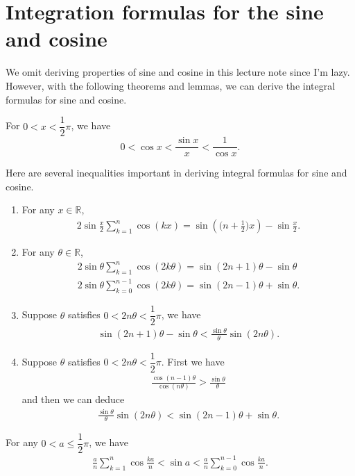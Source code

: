 	\section{Integration formulas for the sine and cosine}
	We omit deriving properties of sine and cosine in this lecture note since I'm lazy. However, with the following theorems and lemmas, we can derive the integral formulas for sine and cosine.
	\begin{theoremenv}
		For $0<x<\dfrac{1}{2}\pi$, we have
		\[
		0<\cos x< \frac{\sin x}{x} < \frac{1}{\cos x}.
		\]
	\end{theoremenv}
	\begin{lemmaenv}
		Here are several inequalities important in deriving integral formulas
		for sine and cosine.
		\begin{enumerate}
			\item For any $x\in\mathbb R$,
			\begin{align*}
				2\sin\frac{x}{2}\sum_{k=1}^{n}\cos(kx)=\sin\!\left(\Big(n+\frac12\Big)x\right)-\sin\frac{x}{2}.
			\end{align*}
			
			\item For any $\theta\in\mathbb R$,
			\begin{align*}
				2\sin\theta\sum_{k=1}^{n}\cos(2k\theta)=\sin(2n+1)\theta-\sin\theta
				\\
				2\sin\theta\sum_{k=0}^{n-1}\cos(2k\theta)=\sin(2n-1)\theta+\sin\theta.
			\end{align*}
			
			\item Suppose $\theta$ satisfies $0<2n\theta<\dfrac12\pi$, we have
			\begin{align*}
				\sin(2n+1)\theta-\sin\theta<\frac{\sin\theta}{\theta}\sin(2n\theta).
			\end{align*}
			
			\item Suppose $\theta$ satisfies $0<2n\theta<\dfrac12\pi$. First we have
			\begin{align*}
				\frac{\cos(n-1)\theta}{\cos(n\theta)}>\frac{\sin\theta}{\theta}
			\end{align*}
			and then we can deduce
			\begin{align*}
				\frac{\sin\theta}{\theta}\sin(2n\theta)<\sin(2n-1)\theta+\sin\theta.
			\end{align*}
		\end{enumerate}
	\end{lemmaenv}
	\begin{theoremenv}
		For any $0<a\le \dfrac12\pi$, we have
		\begin{align*}
			\frac{a}{n}\sum_{k=1}^{n}\cos\frac{ka}{n}<\sin a
			<
			\frac{a}{n}\sum_{k=0}^{n-1}\cos\frac{ka}{n}.
		\end{align*}
	\end{theoremenv}
